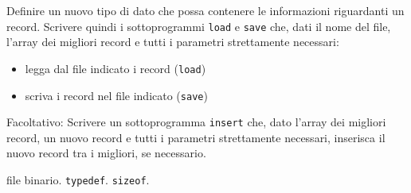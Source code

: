 Definire un nuovo tipo di dato che possa contenere le informazioni riguardanti un record.
Scrivere quindi i sottoprogrammi \texttt{load} e \texttt{save} che, dati il nome del file, l'array dei migliori record e tutti i parametri strettamente necessari:
\begin{itemize}
    \item legga dal file indicato i record (\texttt{load})
    \item scriva i record nel file indicato (\texttt{save})
\end{itemize}

Facoltativo:
Scrivere un sottoprogramma \texttt{insert} che, dato l'array dei migliori record, un nuovo record e tutti i parametri strettamente necessari, inserisca il nuovo record tra i migliori, se necessario.

\begin{tags}
file binario. \texttt{typedef}. \texttt{sizeof}.
\end{tags}


%
%
%
%
%

